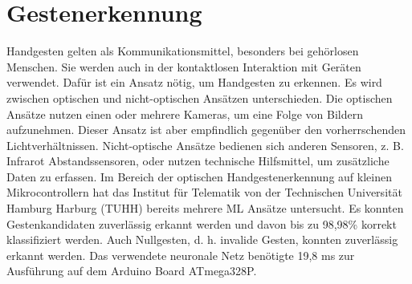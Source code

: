 \chapter{Gestenerkennung}
Handgesten gelten als Kommunikationsmittel, besonders bei gehörlosen Menschen. Sie werden auch in der kontaktlosen Interaktion mit Geräten verwendet. Dafür ist ein Ansatz nötig, um Handgesten
zu erkennen. Es wird zwischen optischen und nicht-optischen Ansätzen unterschieden. Die optischen Ansätze nutzen einen
oder mehrere Kameras, um eine Folge von Bildern aufzunehmen. Dieser Ansatz ist aber empfindlich gegenüber den vorherrschenden Lichtverhältnissen.
Nicht-optische Ansätze bedienen sich anderen Sensoren, z. B. Infrarot Abstandssensoren, oder nutzen technische Hilfsmittel, um zusätzliche Daten zu erfassen.
\newline
\newline
Im Bereich der optischen Handgestenerkennung auf kleinen Mikrocontrollern hat das Institut für Telematik von der Technischen Universität Hamburg Harburg (TUHH) bereits mehrere ML Ansätze untersucht.
Es konnten Gestenkandidaten zuverlässig erkannt werden und davon bis zu 98,98\% korrekt klassifiziert werden. Auch Nullgesten, d. h. invalide Gesten, konnten zuverlässig erkannt werden. Das verwendete neuronale Netz
benötigte 19,8 ms zur Ausführung auf dem Arduino Board ATmega328P.


